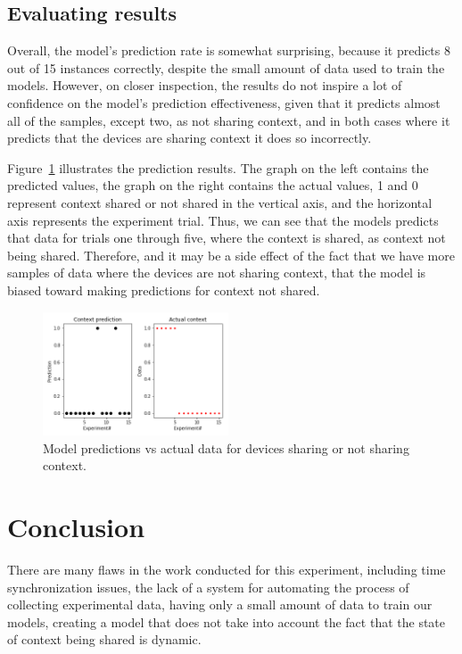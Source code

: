 \documentclass[journal]{IEEEtranTIE}
\begin{document}
\begin{enumerate}
\begin{enumerate}
\subsection{Evaluating results}

Overall, the model's prediction rate is somewhat surprising, because it predicts
8 out of 15 instances correctly, despite the small amount of data used to train
the models. However, on closer inspection, the results do not inspire a lot of
confidence on the model's prediction effectiveness, given that it predicts
almost all of the samples, except two, as not sharing context, and in both cases
where it predicts that the devices are sharing context it does so incorrectly.

Figure~\ref{fig:model_eval} illustrates the prediction results. The graph on the
left contains the predicted values, the graph on the right contains the actual
values, 1 and 0 represent context shared or not shared in the vertical axis, and
the horizontal axis represents the experiment trial. Thus, we can see that the
models predicts that data for trials one through five, where the context is
shared, as context not being shared. Therefore, and it may be a side effect of
the fact that we have more samples of data where the devices are not sharing
context, that the model is biased toward making predictions for context not
shared.

\begin{figure}[!t]\centering
	\includegraphics[width=5.5cm]{prediction_vs_actual}
	\caption{Model predictions vs actual data for devices sharing or not sharing
             context.}\label{fig:model_eval}
\end{figure}

\section{Conclusion}

There are many flaws in the work conducted for this experiment, including time
synchronization issues, the lack of a system for automating the process of
collecting experimental data, having only a small amount of data to train our
models, creating a model that does not take into account the fact that the state
of context being shared is dynamic.


\end{enumerate}
\end{enumerate}
\end{document}
